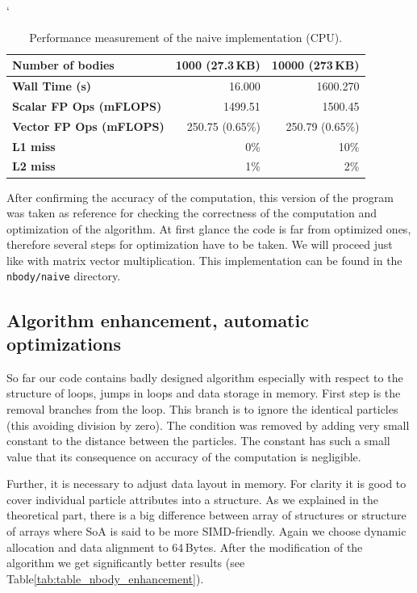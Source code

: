 \begin{table}[ht]
\catcode`
\begin{center}
\begin{tabular}{| l | r | r |} \hline
\textbf{Number of bodies} & 1000 (27.3\,KB) & 10000 (273\,KB)\\ \hline
\textbf{Wall Time (s)} & 16.000 & 1600.270\\ \hline
\textbf{Scalar FP Ops (mFLOPS)} & 1499.51 & 1500.45\\ \hline
\textbf{Vector FP Ops (mFLOPS)} & 250.75 (0.65\%) & 250.79 (0.65\%)\\ \hline
\textbf{L1 miss} & 0\% & 10\%\\ \hline
\textbf{L2 miss} & 1\% & 2\%\\ \hline
\end{tabular}
\caption{Performance measurement of the naive implementation (CPU).}
\label{tab:table_nbody_naive}
\end{center}
\end{table}

After confirming the accuracy of the computation, this version of the program was taken as reference for checking the correctness of the computation and optimization of the algorithm. At first glance the code is far from optimized ones, therefore several steps for optimization have to be taken. We will proceed just like with matrix vector multiplication. This implementation can be found in the \texttt{nbody/naive} directory.

\subsection{Algorithm enhancement, automatic optimizations}
So far our code contains badly designed algorithm especially with respect to the structure of loops, jumps in loops and data storage in memory. First step is the removal branches from the loop. This branch is to ignore the identical particles (this avoiding division by zero). The condition was removed by adding very small constant to the distance between the particles. The constant has such a small value that its consequence on accuracy of the computation is negligible.

\par Further, it is necessary to adjust data layout in memory. For clarity it is good to cover individual particle attributes into a structure. As we explained in the theoretical part, there is a big difference between array of structures or structure of arrays where SoA is said to be more SIMD-friendly. Again we choose dynamic allocation and data alignment to 64\,Bytes. After the modification of the algorithm we get significantly better results (see Table\ref{tab:table_nbody_enhancement}).

